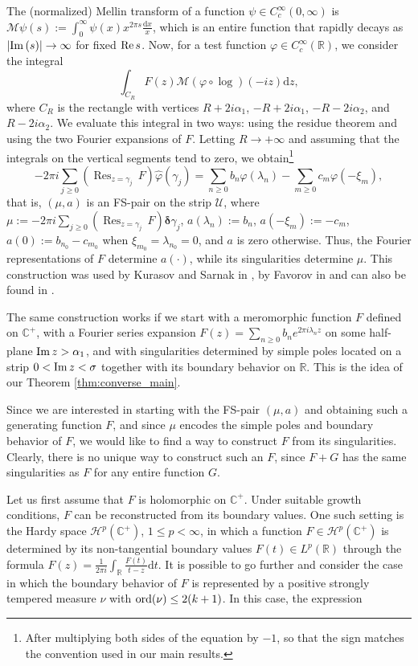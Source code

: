 \documentclass[a4paper,reqno,12pt]{amsart}
\newcommand{\M}{\mathcal{M}}
\newcommand{\U}{\mathcal{U}}
\renewcommand{\r}{\mathbb{R}}
\newcommand{\cp}{\mathbb{C}} %
\newcommand{\ft}{\widehat}
\newcommand{\bo}{\boldsymbol}
\newcommand{\la}{\lambda}
\newcommand{\ga}{\gamma}
\newcommand{\al}{\alpha}
\newcommand{\si}{\sigma}
\newcommand{\p}{\varphi}
\newcommand{\ord}{{\rm ord}}
\renewcommand{\d}{\mathrm{d}}
\newcommand{\1}{{\bf 1}}
\newcommand{\ra}{\rightarrow}
\newcommand{\del}{{\bo \delta}}
\renewcommand{\Re}{{\rm Re}\,}
\renewcommand{\Im}{{\rm Im}\,}
\newcommand{\res}[1]{ \mathop{\mathrm{Res}}_{z = #1}\,}
\begin{document}
The (normalized) Mellin transform of a function $\psi\in C^\infty_c(0,\infty)$ is $\M\psi(s):=\int_{0}^{\infty} \psi(x)x^{2\pi s}\frac{\d x}{x}$, which is an entire function that rapidly decays as $|\Im(s)|\ra\infty$ for fixed $\Re{s}$. Now, for a test function $\p\in C^\infty_c(\r)$, we consider the integral
\begin{equation}
\label{eq:integral_example}
    \int_{C_R} F(z)\M(\p\circ\log)(-iz)\d z,
\end{equation}
where $C_R$ is the rectangle with vertices $R+2i\al_1$, $-R+2i\al_1$, $-R-2i\al_2$, and $R-2i\al_2$. We evaluate this integral in two ways: using the residue theorem and using the two Fourier expansions of $F$. Letting $R\ra+\infty$ and assuming that the integrals on the vertical segments tend to zero, we obtain\footnote{After multiplying both sides of the equation by $-1$, so that the sign matches the convention used in our main results.}
\begin{equation}
    -2\pi i\sum_{j\geq0} \left(\res{\ga_j}F\right)\ft{\p}(\ga_j)=\sum_{n\geq0} b_n\p(\la_n)-\sum_{m\geq0} c_m\p(-\xi_m),
\end{equation}
that is, $(\mu,a)$ is an FS-pair on the strip $\U$, where $\mu:=-2\pi i\sum_{j\geq0} \left(\res{\ga_j}F\right)\del{\ga_j}$, $a(\la_n):=b_n$, $a(-\xi_m):=-c_m$, $a(0):=b_{n_0}-c_{m_0}$ when $\xi_{m_0}=\la_{n_0}=0$, and $a$ is zero otherwise. Thus, the Fourier representations of $F$ determine $a(\cdot)$, while its singularities determine $\mu$. This construction was used by Kurasov and Sarnak in \cite{KS}, by Favorov in \cite{F24,Fstrip,FEntire} and can also be found in \cite{BRS}.

The same construction works if we start with a meromorphic function $F$ defined on $\cp^+$, with a Fourier series expansion $F(z)=\sum_{n\geq0} b_n e^{2\pi i\la_nz}$ on some half-plane $\Im{z}>\al_1$, and with singularities determined by simple poles located on a strip $0<\Im{z}<\si$ together with its boundary behavior on $\r$. This is the idea of our Theorem \ref{thm:converse_main}. 

Since we are interested in starting with the FS-pair $(\mu,a)$ and obtaining such a generating function $F$, and since $\mu$ encodes the simple poles and boundary behavior of $F$, we would like to find a way to construct $F$ from its singularities. Clearly, there is no unique way to construct such an $F$, since $F+G$ has the same singularities as $F$ for any entire function $G$.

Let us first assume that $F$ is holomorphic on $\mathbb{C}^+$. Under suitable growth conditions, $F$ can be reconstructed from its boundary values. One such setting is the Hardy space $\mathcal{H}^p(\mathbb{C}^+)$, $1\leq p<\infty$, in which a function $F\in\mathcal{H}^p(\mathbb{C}^+)$ is determined by its non-tangential boundary values $F(t)\in L^p(\mathbb{R})$ through the formula $F(z)=\frac{1}{2\pi i}\int_{\r} \frac{F(t)}{t-z}\d t$. It is possible to go further and consider the case in which the boundary behavior of $F$ is represented by a positive strongly tempered measure $\nu$ with $\ord(\nu)\leq 2(k+1)$. In this case, the expression
\end{document}
